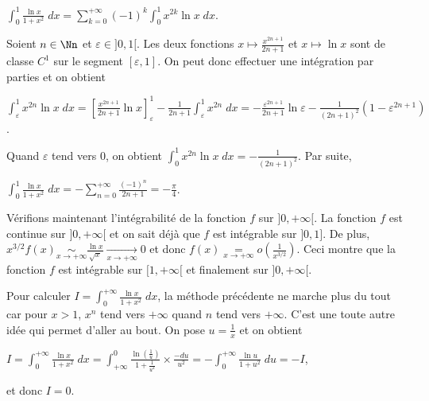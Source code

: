 {{\begin{center}
$\int_{0}^{1}\frac{\ln x}{1+x^2}\;dx=\sum_{k=0}^{+\infty}(-1)^k\int_{0}^{1}x^{2k}\ln x\;dx$.
\end{center}

Soient $n\in\Nn$ et $\varepsilon\in]0,1[$. Les deux fonctions $x\mapsto\frac{x^{2n+1}}{2n+1}$ et $x\mapsto\ln x$ sont de classe $C^1$ sur le segment $[\varepsilon,1]$. On peut donc effectuer une intégration par parties et on obtient

\begin{center}
$\int_{\varepsilon}^{1}x^{2n}\ln x\;dx=\left[\frac{x^{2n+1}}{2n+1}\ln x\right]_\varepsilon^1-\frac{1}{2n+1}\int_{\varepsilon}^{1}x^{2n}\;dx=-\frac{\varepsilon^{2n+1}}{2n+1}\ln \varepsilon-\frac{1}{(2n+1)^2}(1-\varepsilon^{2n+1})$.
\end{center}

Quand $\varepsilon$ tend vers $0$, on obtient $\int_{0}^{1}x^{2n}\ln x\;dx=-\frac{1}{(2n+1)^2}$. Par suite,

\begin{center}
$\int_{0}^{1}\frac{\ln x}{1+x^2}\;dx=-\sum_{n=0}^{+\infty}\frac{(-1)^n}{2n+1}=-\frac{\pi}{4}$.
\end{center}

Vérifions maintenant l'intégrabilité de la fonction $f$ sur $]0,+\infty[$. La fonction $f$ est continue sur $]0,+\infty[$ et on sait déjà que $f$ est intégrable sur $]0,1]$. De plus, $x^{3/2}f(x)\underset{x\rightarrow+\infty}{\sim}\frac{\ln x}{\sqrt{x}}\underset{x\rightarrow+\infty}{\rightarrow}0$ et donc $f(x)\underset{x\rightarrow+\infty}{=}o\left(\frac{1}{x^{3/2}}\right)$. Ceci montre que la fonction $f$ est intégrable sur $[1,+\infty[$ et finalement sur $]0,+\infty[$.

Pour calculer $I=\int_{0}^{+\infty}\frac{\ln x}{1+x^2}\;dx$, la méthode précédente ne marche plus du tout  car pour $x>1$, $x^{n}$ tend vers $+\infty$ quand $n$ tend vers $+\infty$. C'est une toute autre idée qui permet d'aller au bout. On pose $u=\frac{1}{x}$ et on obtient

\begin{center}
$I=\int_{0}^{+\infty}\frac{\ln x}{1+x^2}\;dx=\int_{+\infty}^{0}\frac{\ln\left(\frac{1}{u}\right)}{1+\frac{1}{u^2}}\times\frac{-du}{u^2}=-\int_{0}^{+\infty}\frac{\ln u}{1+u^2}\;du=-I$,
\end{center}

et donc $I=0$.

\begin{center}
\end{center}
}
}
